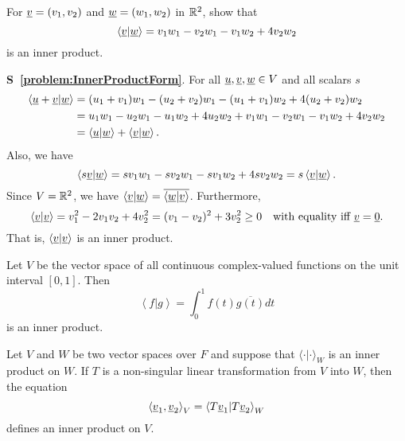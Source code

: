 \begin{problem} \label{problem:InnerProductForm}
For $\underline{v} = (v_1, v_2)$ and $\underline{w} = (w_1, w_2)$  in $\mathbb{R}^2$, show that
\begin{equation*}
\left\langle \underline{v} | \underline{w} \right\rangle
= v_1 w_1 - v_2 w_1 - v_1 w_2 + 4 v_2 w_2
\end{equation*}
is an inner product.
\end{problem}
\noindent \textbf{S~\ref{problem:InnerProductForm}}.
For all $\underline{u}, \underline{v}, \underline{w} \in V$ and all scalars $s$
\begin{equation*}
\begin{split}
\left\langle \underline{u} + \underline{v} | \underline{w} \right\rangle
&= (u_1 + v_1) w_1 - (u_2 + v_2) w_1 - (u_1 + v_1) w_2 + 4 (u_2 + v_2) w_2 \\
&= u_1 w_1 - u_2 w_1 - u_1 w_2 + 4 u_2 w_2
+ v_1 w_1 - v_2 w_1 - v_1 w_2 + 4 v_2 w_2 \\
&= \left\langle \underline{u} | \underline{w} \right\rangle
+ \left\langle \underline{v} | \underline{w} \right\rangle.
\end{split}
\end{equation*}
Also, we have
\begin{equation*}
\left\langle s \underline{v} | \underline{w} \right\rangle
= s v_1 w_1 - s v_2 w_1 - s v_1 w_2 + 4 s v_2 w_2
= s \left\langle \underline{v} | \underline{w} \right\rangle.
\end{equation*}
Since $V = \mathbb{R}^2$, we have $\left\langle \underline{v} | \underline{w} \right\rangle = \overline{ \left\langle \underline{w} | \underline{v} \right\rangle }$.
Furthermore,
\begin{equation*}
\left\langle \underline{v} | \underline{v} \right\rangle
= v_1^2 - 2 v_1 v_2 + 4 v_2^2
= ( v_1 - v_2 )^2 + 3 v_2^2
\geq 0
\quad \text{with equality iff } \underline{v} = \underline{0}.
\end{equation*}
That is, $\left\langle \underline{v} | \underline{v} \right\rangle$ is an inner product.


\begin{example}
Let $V$ be the vector space of all continuous complex-valued functions on the unit interval $[0,1]$.
Then
\begin{equation*}
\left\langle f | g \right\rangle
= \int_0^1 f(t) \overline{g(t)} dt
\end{equation*}
is an inner product.
\end{example}

\begin{example}
Let $V$ and $W$ be two vector spaces over $F$ and suppose that $\langle \cdot | \cdot \rangle_W$ is an inner product on $W$.
If $T$ is a non-singular linear transformation from $V$ into $W$, then the equation
\begin{equation*}
\left\langle \underline{v}_1, \underline{v}_2 \right\rangle_V
= \left\langle T \underline{v}_1 | T \underline{v}_2 \right\rangle_W
\end{equation*}
defines an inner product on $V$.
\end{example}

